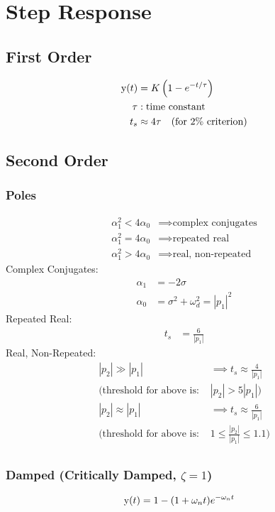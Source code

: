 \section*{Step Response}
\subsection*{First Order}
\begin{align*}
    \func{y}[t] &= K \left(1 - e^{-t/\tau}\right) \\
    \tau &: \text{time constant} \\
    t_s &\approx 4\tau \quad (\text{for 2\% criterion})
\end{align*}

\subsection*{Second Order}
\subsubsection*{Poles}
\begin{align*}
    \alpha_1^2 < 4 \alpha_0 &\implies \text{complex conjugates} \\
    \alpha_1^2 = 4 \alpha_0 &\implies \text{repeated real} \\
    \alpha_1^2 > 4 \alpha_0 &\implies \text{real, non-repeated}
\end{align*}
Complex Conjugates:
\begin{align*}
    \alpha_1 &= -2 \sigma \\
    \alpha_0 &= \sigma^2 + \omega_d^2 = |p_1|^2
\end{align*}
Repeated Real:
\begin{align*}
    t_s &= \frac{6}{|p_1|}
\end{align*}
Real, Non-Repeated:
\begin{align*}
    |p_2| \gg |p_1| &\implies t_s \approx \frac{4}{|p_1|} \\
    (\text{threshold for above is: } & |p_2|>5|p_1|)\\
    |p_2| \approx |p_1| &\implies t_s \approx \frac{6}{|p_1|} \\
    (\text{threshold for above is: } & 1 \leqslant \frac{|p_2|}{|p_1|} \leqslant 1.1)\\
\end{align*}

\subsubsection*{Damped (Critically Damped, \(\zeta = 1\))}
\begin{align*}
    \func{y}[t] &= 1 - (1+\omega_n t)e^{-\omega_n t}
\end{align*}

